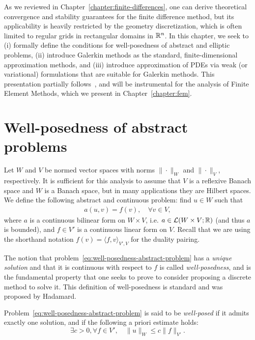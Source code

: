 As we reviewed in Chapter~\ref{chapter:finite-differences}, one can derive theoretical convergence and stability guarantees for the finite difference method, but its applicability is heavily restricted by the geometry discretization, which is often limited to regular grids in rectangular domains in $\mathbb{R}^n$. In this chapter, we seek to (i) formally define the conditions for well-posedness of abstract and elliptic problems, (ii) introduce Galerkin methods as the standard, finite-dimensional approximation methods, and (iii) introduce approximation of PDEs via weak (or variational) formulations that are suitable for Galerkin methods. This presentation partially follows~\cite{ern2004theory}, and will be instrumental for the analysis of Finite Element Methods, which we present in Chapter~\ref{chapter:fem}.

\section{Well-posedness of abstract problems}
Let $W$ and $V$ be normed vector spaces with norms $\|\cdot\|_W$ and $\|\cdot\|_V$, respectively. It is sufficient for this analysis to assume that $V$ is a reflexive Banach space and $W$ is a Banach space, but in many applications they are Hilbert spaces. We define the following abstract and continuous problem: find $u\in W$ such that
\begin{equation}\label{eq:well-posedness-abstract-problem}
    \begin{aligned}
        a(u,v) = f(v),\quad \forall v\in V,
    \end{aligned}
\end{equation}
where $a$ is a continuous bilinear form on $W\times V$, i.e. $a\in \mathcal{L}(W\times V; \mathbb{R})$ (and thus $a$ is bounded), and $f\in V'$ is a continuous linear form on $V$. Recall that we are using the shorthand notation $f(v)=\langle f, v\rangle_{V',V}$ for the duality pairing. 

The notion that problem~\ref{eq:well-posedness-abstract-problem} has a \emph{unique solution} and that it is continuous with respect to $f$ is called \emph{well-posedness}, and is the fundamental property that one seeks to prove to consider proposing a discrete method to solve it. This definition of well-posedness is standard and was proposed by Hadamard. 
\begin{definition}
    Problem~\ref{eq:well-posedness-abstract-problem} is said to be \emph{well-posed} if it admits exactly one solution, and if the following a priori estimate holds: 
    \begin{equation}
        \exists c>0, \forall f\in V',\quad \|u\|_W \leq c\|f\|_{V'}.
    \end{equation}
\end{definition}

